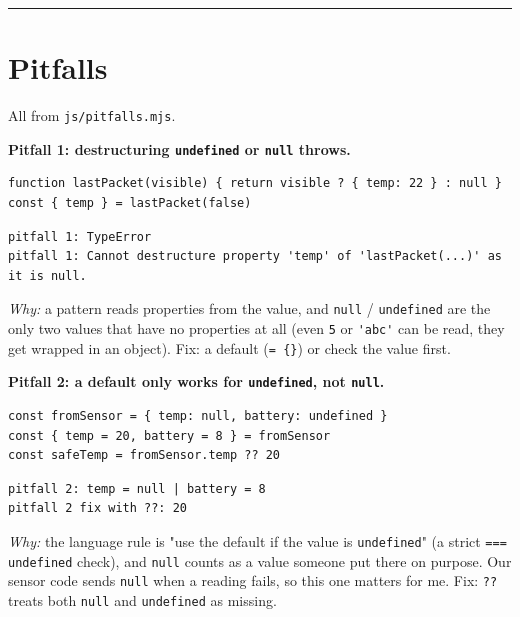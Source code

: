 \begin{center}\rule{0.5\linewidth}{0.5pt}\end{center}

\hypertarget{pitfalls}{%
\section{Pitfalls}\label{pitfalls}}

All from \passthrough{\lstinline!js/pitfalls.mjs!}.

\textbf{Pitfall 1: destructuring \passthrough{\lstinline!undefined!} or \passthrough{\lstinline!null!} throws.}

\begin{lstlisting}
function lastPacket(visible) { return visible ? { temp: 22 } : null }
const { temp } = lastPacket(false)
\end{lstlisting}

\begin{lstlisting}
pitfall 1: TypeError
pitfall 1: Cannot destructure property 'temp' of 'lastPacket(...)' as it is null.
\end{lstlisting}

\emph{Why:} a pattern reads properties from the value, and \passthrough{\lstinline!null!} / \passthrough{\lstinline!undefined!} are the only two values that have no properties at all (even \passthrough{\lstinline!5!} or \passthrough{\lstinline!'abc'!} can be read, they get wrapped in an object). Fix: a default (\passthrough{\lstinline!= \{\}!}) or check the value first.

\textbf{Pitfall 2: a default only works for \passthrough{\lstinline!undefined!}, not \passthrough{\lstinline!null!}.}

\begin{lstlisting}
const fromSensor = { temp: null, battery: undefined }
const { temp = 20, battery = 8 } = fromSensor
const safeTemp = fromSensor.temp ?? 20
\end{lstlisting}

\begin{lstlisting}
pitfall 2: temp = null | battery = 8
pitfall 2 fix with ??: 20
\end{lstlisting}

\emph{Why:} the language rule is "use the default if the value is \passthrough{\lstinline!undefined!}" (a strict \passthrough{\lstinline!=== undefined!} check), and \passthrough{\lstinline!null!} counts as a value someone put there on purpose. Our sensor code sends \passthrough{\lstinline!null!} when a reading fails, so this one matters for me. Fix: \passthrough{\lstinline!??!} treats both \passthrough{\lstinline!null!} and \passthrough{\lstinline!undefined!} as missing.

